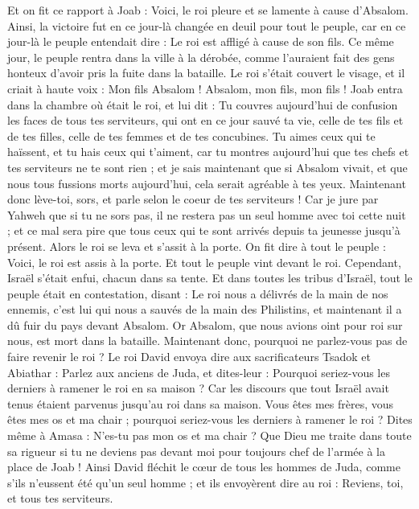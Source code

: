 \begin{multicols}{2}
\VerseOne{}Et on fit ce rapport à Joab : Voici, le roi pleure et se lamente à cause d'Absalom.
Ainsi, la victoire fut en ce jour-là changée en deuil pour tout le peuple, car en ce jour-là le peuple entendait dire : Le roi est affligé à cause de son fils.
Ce même jour, le peuple rentra dans la ville à la dérobée, comme l'auraient fait des gens honteux d'avoir pris la fuite dans la bataille.
Le roi s'était couvert le visage, et il criait à haute voix : Mon fils Absalom ! Absalom, mon fils, mon fils !
Joab entra dans la chambre où était le roi, et lui dit : Tu couvres aujourd'hui de confusion les faces de tous tes serviteurs, qui ont en ce jour sauvé ta vie, celle de tes fils et de tes filles, celle de tes femmes et de tes concubines.
Tu aimes ceux qui te haïssent, et tu hais ceux qui t'aiment, car tu montres aujourd'hui que tes chefs et tes serviteurs ne te sont rien ; et je sais maintenant que si Absalom vivait, et que nous tous fussions morts aujourd'hui, cela serait agréable à tes yeux.
Maintenant donc lève-toi, sors, et parle selon le coeur de tes serviteurs ! Car je jure par Yahweh que si tu ne sors pas, il ne restera pas un seul homme avec toi cette nuit ; et ce mal sera pire que tous ceux qui te sont arrivés depuis ta jeunesse jusqu'à présent.
Alors le roi se leva et s'assit à la porte. On fit dire à tout le peuple : Voici, le roi est assis à la porte. Et tout le peuple vint devant le roi. Cependant, Israël s'était enfui, chacun dans sa tente.
Et dans toutes les tribus d'Israël, tout le peuple était en contestation, disant : Le roi nous a délivrés de la main de nos ennemis, c'est lui qui nous a sauvés de la main des Philistins, et maintenant il a dû fuir du pays devant Absalom.
Or Absalom, que nous avions oint pour roi sur nous, est mort dans la bataille. Maintenant donc, pourquoi ne parlez-vous pas de faire revenir le roi ?
Le roi David envoya dire aux sacrificateurs Tsadok et Abiathar : Parlez aux anciens de Juda, et dites-leur : Pourquoi seriez-vous les derniers à ramener le roi en sa maison ? Car les discours que tout Israël avait tenus étaient parvenus jusqu'au roi dans sa maison.
Vous êtes mes frères, vous êtes mes os et ma chair ; pourquoi seriez-vous les derniers à ramener le roi ?
Dites même à Amasa : N'es-tu pas mon os et ma chair ? Que Dieu me traite dans toute sa rigueur si tu ne deviens pas devant moi pour toujours chef de l'armée à la place de Joab !
Ainsi David fléchit le cœur de tous les hommes de Juda, comme s'ils n'eussent été qu'un seul homme ; et ils envoyèrent dire au roi : Reviens, toi, et tous tes serviteurs.

\end{multicols}

